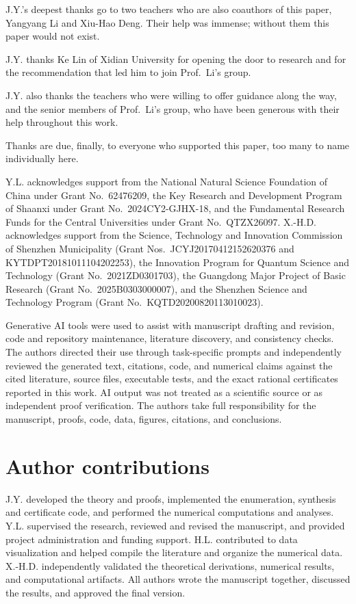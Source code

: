 \documentclass[aps,prx,twocolumn,superscriptaddress,nofootinbib,longbibliography]{revtex4-2}
\theoremstyle{plain}
\theoremstyle{definition}
\theoremstyle{remark}
\begin{document}
\begin{acknowledgments}
J.Y.'s deepest thanks go to two teachers who are also coauthors of this
paper, Yangyang Li and Xiu-Hao Deng. Their help was immense; without them
this paper would not exist.

J.Y. thanks Ke Lin of Xidian University for opening the door to research
and for the recommendation that led him to join Prof.~Li's group.

J.Y. also thanks the teachers who were willing to offer guidance along the
way, and the senior members of Prof.~Li's group, who have been generous
with their help throughout this work.

Thanks are due, finally, to everyone who supported this paper, too many to
name individually here.

Y.L. acknowledges support from the National Natural Science Foundation of
China under Grant No.~62476209, the Key Research and Development Program of
Shaanxi under Grant No.~2024CY2-GJHX-18, and the Fundamental Research Funds
for the Central Universities under Grant No.~QTZX26097. X.-H.D.
acknowledges support from the Science, Technology and Innovation Commission of Shenzhen
Municipality (Grant Nos.~JCYJ20170412152620376 and KYTDPT20181011104202253),
the Innovation Program for Quantum Science and Technology (Grant
No.~2021ZD0301703), the Guangdong Major Project of Basic Research (Grant
No.~2025B0303000007), and the Shenzhen Science and Technology Program
(Grant No.~KQTD20200820113010023).

Generative AI tools were used to assist with manuscript drafting and
revision, code and repository maintenance, literature discovery, and
consistency checks. The authors directed their use through task-specific
prompts and independently reviewed the generated text, citations, code, and
numerical claims against the cited literature, source files, executable tests,
and the exact rational certificates reported in this work. AI output was
not treated as a scientific source or as independent proof verification. The
authors take full responsibility for the manuscript, proofs, code, data,
figures, citations, and conclusions.
\end{acknowledgments}

\section*{Author contributions}
J.Y. developed the theory and proofs, implemented the enumeration, synthesis and certificate code, and performed
the numerical computations and analyses. Y.L. supervised the research, reviewed and revised the manuscript,
and provided project administration and funding support. H.L. contributed to
data visualization and helped compile the literature and organize the numerical data. X.-H.D.
independently validated the theoretical derivations, numerical results, and
computational artifacts. All authors wrote the manuscript together,
discussed the results, and approved the final version.
\end{document}
